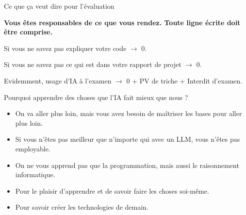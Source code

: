 \documentclass{beamer}
\begin{document}
\begin{frame}{Ce que ça veut dire pour l'évaluation}

    \begin{center}
        \textbf{Vous êtes responsables de ce que vous rendez. Toute ligne écrite doit être comprise.}
    \end{center}


    \begin{center}
        \item Si vous ne savez pas expliquer votre code $\to$ 0.
        \item Si vous ne savez pas ce qui est dans votre rapport de projet $\to$ 0.
        \item Evidemment, usage d'IA à l'examen $\to$ 0 + PV de triche + Interdit d'examen.
    \end{center}
\end{frame}

\begin{frame}{Pourquoi apprendre des choses que l'IA fait mieux que nous ?}

\begin{itemize}
    \item On va aller plus loin, mais vous avez besoin de maîtriser les bases pour aller plus loin.
    \pause\item Si vous n'êtes pas meilleur que n'importe qui avec un LLM, vous n'êtes pas employable.
    \pause\item On ne vous apprend pas que la programmation, mais aussi le raisonnement informatique.
    \pause\item Pour le plaisir d'apprendre et de savoir faire les choses soi-même.
    \pause\item Pour savoir créer les technologies de demain.
\end{itemize}
    
\end{frame}
\end{document}
